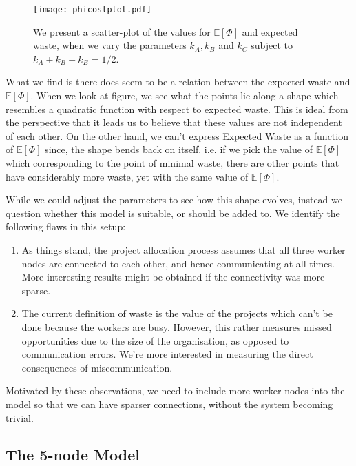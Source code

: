 \begin{figure}[!ht]
	\centering
	\texttt{[image: phicostplot.pdf]}
	\caption{We present a scatter-plot of the values for $\mathbb{E}[\Phi]$ and expected waste, when we vary the parameters $k_A, k_B$ and $k_C$ subject to $k_A+k_B+k_B=1/2$.}
	\label{fig:simple_model_phi_cost_plot}
\end{figure}

What we find is there does seem to be a relation between the expected waste and $\mathbb{E}[\Phi]$. When we look at figure, we see what the points lie along a shape which resembles a quadratic function with respect to expected waste. This is ideal from the perspective that it leads us to believe that these values are not independent of each other. On the other hand, we can't express Expected Waste as a function of $\mathbb{E}[\Phi]$ since, the shape bends back on itself. i.e. if we pick the value of $\mathbb{E}[\Phi]$ which corresponding to the point of minimal waste, there are other points that have considerably more waste, yet with the same value of $\mathbb{E}[\Phi]$.

While we could adjust the parameters to see how this shape evolves, instead we question whether this model is suitable, or should be added to. We identify the following flaws in this setup:

\begin{enumerate}
	\item As things stand, the project allocation process assumes that all three worker nodes are connected to each other, and hence communicating at all times. More interesting results might be obtained if the connectivity was more sparse.
	
	\item The current definition of waste is the value of the projects which can't be done because the workers are busy. However, this rather measures missed opportunities due to the size of the organisation, as opposed to communication errors. We're more interested in measuring the direct consequences of miscommunication.

\end{enumerate}

Motivated by these observations, we need to include more worker nodes into the model so that we can have sparser connections, without the system becoming trivial. 

\subsection{The 5-node Model}

